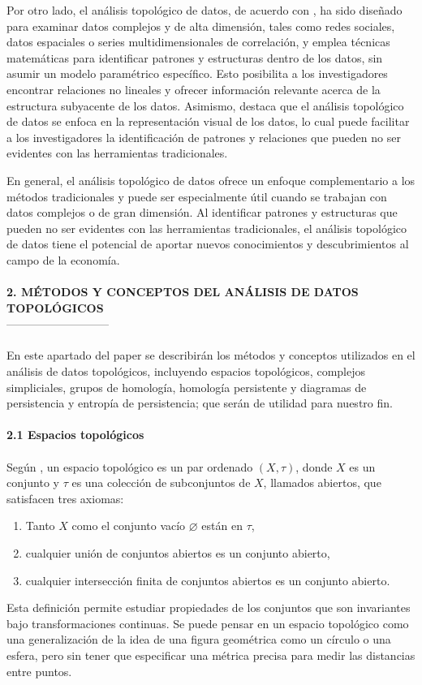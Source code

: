 Por otro lado, el análisis topológico de datos, de acuerdo con \cite{wasserman2016topological}, ha sido diseñado para examinar datos complejos y de alta dimensión, tales como redes sociales, datos espaciales o series multidimensionales de correlación, y emplea técnicas matemáticas para identificar patrones y estructuras dentro de los datos, sin asumir un modelo paramétrico específico. Esto posibilita a los investigadores encontrar relaciones no lineales y ofrecer información relevante acerca de la estructura subyacente de los datos. Asimismo, \cite{carlsson2008zigzag} destaca que el análisis topológico de datos se enfoca en la representación visual de los datos, lo cual puede facilitar a los investigadores la identificación de patrones y relaciones que pueden no ser evidentes con las herramientas tradicionales.

En general, el análisis topológico de datos ofrece un enfoque complementario a los métodos tradicionales y puede ser especialmente útil cuando se trabajan con datos complejos o de gran dimensión. Al identificar patrones y estructuras que pueden no ser evidentes con las herramientas tradicionales, el análisis topológico de datos tiene el potencial de aportar nuevos conocimientos y descubrimientos al campo de la economía.\\\\


\textbf{2. MÉTODOS Y CONCEPTOS DEL ANÁLISIS DE DATOS TOPOLÓGICOS}\\
---------------------------\\\\
En este apartado del paper se describirán los métodos y conceptos utilizados en el análisis de datos topológicos, incluyendo espacios topológicos, complejos simpliciales, grupos de homología, homología persistente y diagramas de persistencia y entropía de persistencia; que serán de utilidad para nuestro fin.\\\\

\textbf{2.1 Espacios topológicos}\\\\
Según \cite{munkres2000topology}, un espacio topológico es un par ordenado $(X, \tau)$, donde $X$ es un conjunto y $\tau$ es una colección de subconjuntos de $X$, llamados abiertos, que satisfacen tres axiomas:
\begin{enumerate}[1.]
    \item  Tanto $X$ como el conjunto vacío $\varnothing$ están en $\tau$,  
    \item cualquier unión de conjuntos abiertos es un conjunto abierto, 
    \item cualquier intersección finita de conjuntos abiertos es un conjunto abierto. 
\end{enumerate}
	Esta definición permite estudiar propiedades de los conjuntos que son invariantes bajo transformaciones continuas. Se puede pensar en un espacio topológico como una generalización de la idea de una figura geométrica como un círculo o una esfera, pero sin tener que especificar una métrica precisa para medir las distancias entre puntos. 

